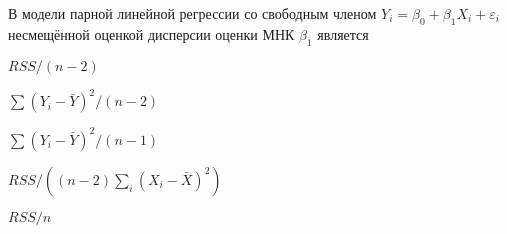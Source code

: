 
\begin{question}
В модели парной линейной регрессии со свободным членом
\(Y_i = \beta_0 + \beta_1 X_i + \varepsilon_i\) несмещённой оценкой
дисперсии оценки МНК \(\hat\beta_1\) является
\begin{answerlist}
  \item \(RSS/(n-2)\)
  \item \(\sum (Y_i - \bar Y)^2 / (n-2)\)
  \item \(\sum (Y_i - \bar Y)^2 / (n-1)\)
  \item \(RSS/((n-2)\sum_i (X_i - \bar X)^2)\)
  \item \(RSS/n\)
\end{answerlist}
\end{question}


